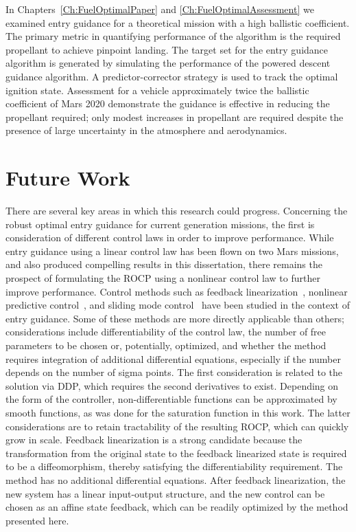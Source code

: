 In Chapters~\ref{Ch:FuelOptimalPaper} and \ref{Ch:FuelOptimalAssessment} we examined entry guidance for a theoretical mission with a high ballistic coefficient. The primary metric in quantifying performance of the algorithm is the required propellant to achieve pinpoint landing. The target set for the entry guidance algorithm is generated by simulating the performance of the powered descent guidance algorithm. A predictor-corrector strategy is used to track the optimal ignition state. Assessment for a vehicle approximately twice the ballistic coefficient of Mars 2020 demonstrate the guidance is effective in reducing the propellant required; only modest increases in propellant are required despite the presence of large uncertainty in the atmosphere and aerodynamics. 

\section{Future Work}
There are several key areas in which this research could progress. Concerning the robust optimal entry guidance for current generation missions, the first is consideration of different control laws in order to improve performance.
While entry guidance using a linear control law has been flown on two Mars missions, and also produced compelling results in this dissertation, there remains the prospect of formulating the ROCP using a nonlinear control law to further improve performance. Control methods such as feedback linearization~\cite{FeedbackLinearization}, nonlinear predictive control~\cite{NMPC, JoelController}, and sliding mode control~\cite{SlidingModeObserver,SlidingModeEG1} have been studied in the context of entry guidance. Some of these methods are more directly applicable than others; considerations include differentiability of the control law, the number of free parameters to be chosen or, potentially, optimized, and whether the method requires integration of additional differential equations, especially if the number depends on the number of sigma points. The first consideration is related to the solution via DDP, which requires the second derivatives to exist. Depending on the form of the controller, non-differentiable functions can be approximated by smooth functions, as was done for the saturation function in this work. The latter considerations are to retain tractability of the resulting ROCP, which can quickly grow in scale.
Feedback linearization is a strong candidate because the transformation from the original state to the feedback linearized state is required to be a diffeomorphism, thereby satisfying the differentiability requirement. The method has no additional differential equations. After feedback linearization, the new system has a linear input-output structure, and the new control can be chosen as an affine state feedback, which can be readily optimized by the method presented here.

